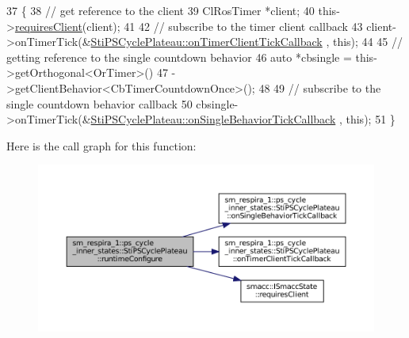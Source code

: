 \begin{DoxyCode}
37   \{
38     \textcolor{comment}{// get reference to the client}
39     ClRosTimer *client;
40     this->\hyperlink{classsmacc_1_1ISmaccState_a7f95c9f0a6ea2d6f18d1aec0519de4ac}{requiresClient}(client);
41 
42     \textcolor{comment}{// subscribe to the timer client callback}
43     client->onTimerTick(&\hyperlink{structsm__respira__1_1_1ps__cycle__inner__states_1_1StiPSCyclePlateau_a474f210a65f1b5769b4debd1e2d555f8}{StiPSCyclePlateau::onTimerClientTickCallback}
      , \textcolor{keyword}{this});
44 
45     \textcolor{comment}{// getting reference to the single countdown behavior}
46     \textcolor{keyword}{auto} *cbsingle = this->getOrthogonal<OrTimer>()
47                           ->getClientBehavior<CbTimerCountdownOnce>();
48 
49     \textcolor{comment}{// subscribe to the single countdown behavior callback}
50     cbsingle->onTimerTick(&\hyperlink{structsm__respira__1_1_1ps__cycle__inner__states_1_1StiPSCyclePlateau_aa5baa83b5b2a295e6a8b8dbac7fe5b01}{StiPSCyclePlateau::onSingleBehaviorTickCallback}
      , \textcolor{keyword}{this});
51   \}
\end{DoxyCode}
Here is the call graph for this function\+:
\nopagebreak
\begin{figure}[H]
\begin{center}
\leavevmode
\includegraphics[width=350pt]{structsm__respira__1_1_1ps__cycle__inner__states_1_1StiPSCyclePlateau_a863e247bf1710ebd5350f61c7264db42_cgraph}
\end{center}
\end{figure}
\mbox{\label{structsm__respira__1_1_1ps__cycle__inner__states_1_1StiPSCyclePlateau_a69e6bd09d36ec45f51287c6787dec2b5}} 
